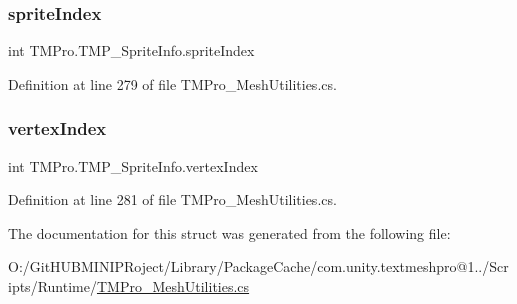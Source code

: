 \mbox{\label{struct_t_m_pro_1_1_t_m_p___sprite_info_a6e2e5b20f244937cb1a1f8a2218e1b21}} 
\subsubsection{\texorpdfstring{spriteIndex}{spriteIndex}}
{\footnotesize\ttfamily int T\+M\+Pro.\+T\+M\+P\+\_\+\+Sprite\+Info.\+sprite\+Index}



Definition at line 279 of file T\+M\+Pro\+\_\+\+Mesh\+Utilities.\+cs.

\mbox{\label{struct_t_m_pro_1_1_t_m_p___sprite_info_a65f40aee8fe65bad773cbfb32552054f}} 
\subsubsection{\texorpdfstring{vertexIndex}{vertexIndex}}
{\footnotesize\ttfamily int T\+M\+Pro.\+T\+M\+P\+\_\+\+Sprite\+Info.\+vertex\+Index}



Definition at line 281 of file T\+M\+Pro\+\_\+\+Mesh\+Utilities.\+cs.



The documentation for this struct was generated from the following file\+:\begin{DoxyCompactItemize}
\item 
O\+:/\+Git\+H\+U\+B\+M\+I\+N\+I\+P\+Roject/\+Library/\+Package\+Cache/com.\+unity.\+textmeshpro@1../\+Scripts/\+Runtime/\mbox{\hyperlink{_t_m_pro___mesh_utilities_8cs}{T\+M\+Pro\+\_\+\+Mesh\+Utilities.\+cs}}\end{DoxyCompactItemize}
